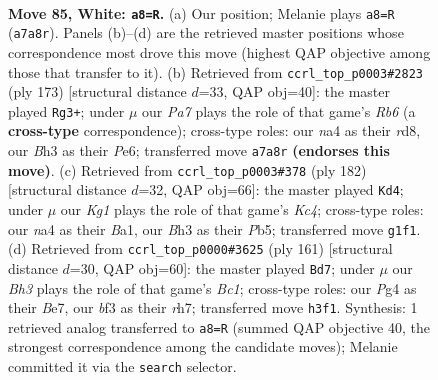 \documentclass[11pt]{article}
\begin{document}
\clearpage

\begin{figure}[p]\centering
\begin{subfigure}{0.46\textwidth}\centering
\resizebox{\linewidth}{!}{%
\newchessgame
\chessboard[
  setfen={8/P1NR4/8/5Pk1/np4P1/5b1B/7P/6K1 w - - 3 85},
  showmover=false,
  pgfstyle=straightmove, color=movearrow, markmove={a7-a8}
]}
\caption{}
\end{subfigure}\hfill
\begin{subfigure}{0.46\textwidth}\centering
\resizebox{\linewidth}{!}{%
\newchessgame
\chessboard[
  setfen={3R4/8/3Bpk2/1p2p3/4PpK1/1r6/8/8 b - - 2 87},
  showmover=false,
  pgfstyle=straightmove, color=movearrow, markmove={b3-g3}
]}
\caption{}
\end{subfigure}
\\[4pt]
\begin{subfigure}{0.46\textwidth}\centering
\resizebox{\linewidth}{!}{%
\newchessgame
\chessboard[
  setfen={8/8/3kP3/1P1P4/2K3b1/2P5/p7/B7 w - - 1 92},
  showmover=false,
  pgfstyle=straightmove, color=movearrow, markmove={c4-d4}
]}
\caption{}
\end{subfigure}\hfill
\begin{subfigure}{0.46\textwidth}\centering
\resizebox{\linewidth}{!}{%
\newchessgame
\chessboard[
  setfen={2b1k3/4b2R/4p3/Bp1pK3/8/1P6/8/8 b - - 43 81},
  showmover=false,
  pgfstyle=straightmove, color=movearrow, markmove={c8-d7}
]}
\caption{}
\end{subfigure}
\caption{\textbf{Move 85, White: \texttt{a8=R}.} (a) Our position; Melanie plays \texttt{a8=R} (\texttt{a7a8r}). Panels (b)--(d) are the retrieved master positions whose correspondence most drove this move (highest QAP objective among those that transfer to it). (b) Retrieved from \texttt{ccrl\_top\_p0003\#2823} (ply 173) [structural distance $d$=33, QAP obj=40]: the master played \texttt{Rg3+}; under $\mu$ our \emph{Pa7} plays the role of that game's \emph{Rb6} (a \textbf{cross-type} correspondence); cross-type roles: our \emph{n}a4 as their \emph{r}d8, our \emph{B}h3 as their \emph{P}e6; transferred move \texttt{a7a8r} \textbf{(endorses this move)}. (c) Retrieved from \texttt{ccrl\_top\_p0003\#378} (ply 182) [structural distance $d$=32, QAP obj=66]: the master played \texttt{Kd4}; under $\mu$ our \emph{Kg1} plays the role of that game's \emph{Kc4}; cross-type roles: our \emph{n}a4 as their \emph{B}a1, our \emph{B}h3 as their \emph{P}b5; transferred move \texttt{g1f1}. (d) Retrieved from \texttt{ccrl\_top\_p0000\#3625} (ply 161) [structural distance $d$=30, QAP obj=60]: the master played \texttt{Bd7}; under $\mu$ our \emph{Bh3} plays the role of that game's \emph{Bc1}; cross-type roles: our \emph{P}g4 as their \emph{B}e7, our \emph{b}f3 as their \emph{r}h7; transferred move \texttt{h3f1}. Synthesis: 1 retrieved analog transferred to \texttt{a8=R} (summed QAP objective 40, the strongest correspondence among the candidate moves); Melanie committed it via the \texttt{search} selector.}
\label{fig:thought-m168}
\end{figure}
\end{document}
